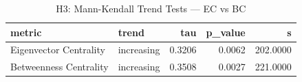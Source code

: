 \begin{table}
\caption{H3: Mann-Kendall Trend Tests — EC vs BC}
\label{tab:h3_mann_kendall}
\begin{tabular}{llrrr}
\toprule
metric & trend & tau & p\_value & s \\
\midrule
Eigenvector Centrality & increasing & 0.3206 & 0.0062 & 202.0000 \\
Betweenness Centrality & increasing & 0.3508 & 0.0027 & 221.0000 \\
\bottomrule
\end{tabular}
\end{table}
